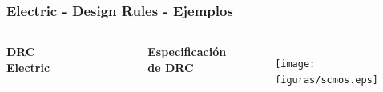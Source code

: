 \documentclass{beamer}
\begin{document}
\begin{frame}
\frametitle{Electric - Design Rules - Ejemplos}
\begin{columns}[c] %
\textbf{DRC Electric}
\begin{figure}
\includegraphics[width=0.99\linewidth]{figuras/configuracionElectric-10B.eps}
\end{figure}

\textbf{Especificación de DRC}
\begin{figure}
\texttt{[image: figuras/scmos.eps]}
\end{figure}

\end{columns}
\end{frame}
\end{document}

